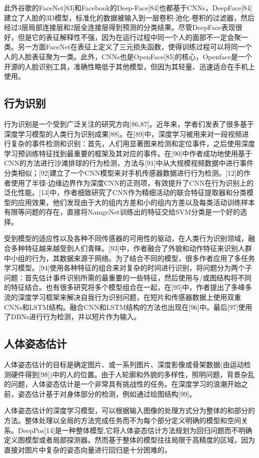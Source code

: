 \documentclass[a4paper]{article}
\begin{document}
此外谷歌的FaceNet[83]和Facebook的Deep-Face[84]也都基于CNNs，DeepFace[84]建立了人脸的3D模型，标准化的数据被输入到一层卷积-池化-卷积的过滤器，然后经过3层局部连接层和2层全连接层得到预测的分类结果。尽管DeepFace表现很好，但是它的表征解释性不强，因为在运行过程中同一个人的面部不一定会聚一类。另一方面FaceNet在表征上定义了三元损失函数，使得训练过程可以将同一个人的人脸表征聚为一类。此外，CNNs也是OpenFace[85]的核心，Openface是一个开源的人脸识别工具，准确性略低于其他模型，但因为其轻量、迅速适合在手机上使用。

\subsection{行为识别}
行为识别是一个受到广泛关注的研究方向[86,87]。近年来，学者们发表了很多基于深度学习模型的人类行为识别成果[88]。在[89]中，深度学习被用来对一段视频进行复杂的事件检测和识别：首先，人们用显著图来检测和定位事件，之后使用深度学习预训练特征找到最重要的框架及其对应的事件。在[90]中作者成功地使用基于CNN的方法进行沙滩排球的行为检测，方法与[91]中从大规模视频数据中进行事件分类相似；[92]建立了一个CNN模型来对手机传感器数据进行行为检测。[12]的作者使用了半径-边缘边界作为深度CNN的正则项，有效提升了CNN在行为识别上的泛化性能。[13]中，作者细致研究了CNN作为精细活动的联合特征提取器和分类模型的应用效果，他们发现由于大的组内方差和小的组内方差以及每类活动训练样本有限等问题的存在，直接将NamgeNet训练出的特征交给SVM分类是一个好的选择。

受到模型的适应性以及各种不同传感器的可用性的驱动，在人类行为识别领域，融合多种特征越来越受到人们青睐。[93]中，作者融合了外貌和动作特征来识别人群中小组的行为，其数据来源于网络。为了结合不同的模型，很多作者应用了多任务学习模型。[94]使用各种特征的组合来对复杂的时间进行识别，将问题分为两个子问题：首先估计事件识别所需的最重要的一些特征，然后使用与/或图结构将不同的特征结合。也有很多研究将多个模型组合在一起，在[95]中，作者提出了多峰多流的深度学习框架来解决自我行为识别问题，在短片和传感器数据上使用双重CNNs和LSTM结构。融合CNN和LSTM结构的方法也出现在[96]中。最后[97]使用了DBNs进行行为检测，并以短片作为输入。
\subsection{人体姿态估计}
人体姿态估计的目标是确定图片、或一系列图片、深度影像或骨架数据(由运动检测硬件得到[98])中的人的位置。由于人轮廓和外貌的多样性，照明问题，背景杂乱的问题，人体姿态估计是一个非常具有挑战性的任务。在深度学习的浪潮开始之前，姿态估计基于对身体部分的检测，例如通过绘图结构[99]。

人体姿态估计的深度学习模型，可以根据输入图像的处理方式分为整体的和部分的方法。整体处理以全局的方法完成任务而不为每个部分定义明确的模型和空间关系。DeepPos[14]是一种整体模型,它将人体姿态估计方法规划为回归问题而不明确定义图模型或者局部探测器。然而基于整体的模型往往局限于高精度的区域，因为直接对图片中复杂的姿态向量进行回归是十分困难的。
\end{document}
